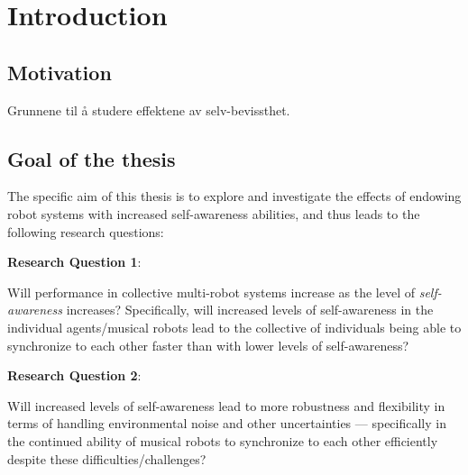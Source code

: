 \chapter{Introduction}
\label{chap:introduction}	


\section{Motivation}
Grunnene til å studere effektene av selv-bevissthet. \nl




\section{Goal of the thesis} %







The specific aim of this thesis is to explore and investigate the effects of endowing robot systems with increased self-awareness abilities, and thus leads to the following research questions: \nl

\textbf{Research Question 1}:

Will performance in collective multi-robot systems increase as the level of \textit{self-awareness} increases? Specifically, will increased levels of self-awareness in the individual agents/musical robots lead to the collective of individuals being able to synchronize to each other faster than with lower levels of self-awareness? \nl

\textbf{Research Question 2}:

Will increased levels of self-awareness lead to more robustness and flexibility in terms of handling environmental noise and other uncertainties — specifically in the continued ability of musical robots to synchronize to each other efficiently despite these difficulties/challenges? \nl

